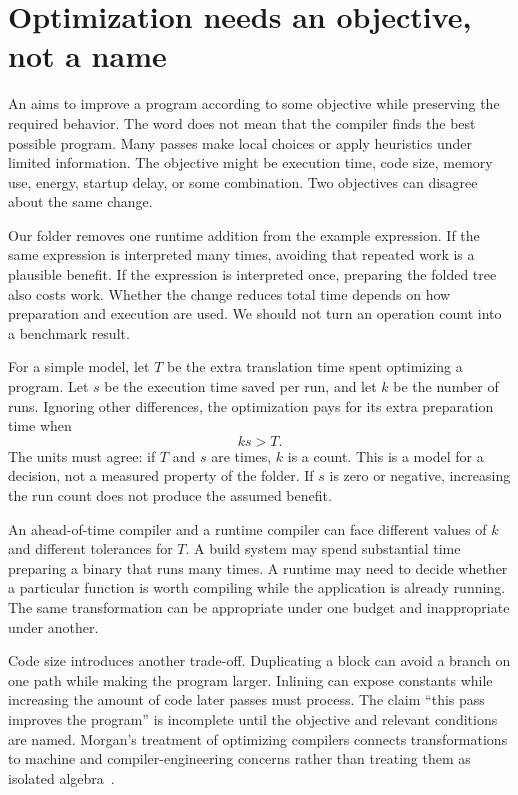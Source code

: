 \section{Optimization needs an objective, not a name}
\label{sec:optimization-objectives}

An  aims to improve a program according to some objective while preserving the required behavior.
The word does not mean that the compiler finds the best possible program.
Many passes make local choices or apply heuristics under limited information.
The objective might be execution time, code size, memory use, energy, startup delay, or some combination.
Two objectives can disagree about the same change.

Our folder removes one runtime addition from the example expression.
If the same expression is interpreted many times, avoiding that repeated work is a plausible benefit.
If the expression is interpreted once, preparing the folded tree also costs work.
Whether the change reduces total time depends on how preparation and execution are used.
We should not turn an operation count into a benchmark result.

For a simple model, let $T$ be the extra translation time spent optimizing a program.
Let $s$ be the execution time saved per run, and let $k$ be the number of runs.
Ignoring other differences, the optimization pays for its extra preparation time when
\begin{equation}
  k s > T.
  \label{eq:optimization-break-even}
\end{equation}
The units must agree: if $T$ and $s$ are times, $k$ is a count.
This is a model for a decision, not a measured property of the folder.
If $s$ is zero or negative, increasing the run count does not produce the assumed benefit.

An ahead-of-time compiler and a runtime compiler can face different values of $k$ and different tolerances for $T$.
A build system may spend substantial time preparing a binary that runs many times.
A runtime may need to decide whether a particular function is worth compiling while the application is already running.
The same transformation can be appropriate under one budget and inappropriate under another.

Code size introduces another trade-off.
Duplicating a block can avoid a branch on one path while making the program larger.
Inlining can expose constants while increasing the amount of code later passes must process.
The claim \enquote{this pass improves the program} is incomplete until the objective and relevant conditions are named.
Morgan's treatment of optimizing compilers connects transformations to machine and compiler-engineering concerns rather than treating them as isolated algebra~\cite[Chapters~1--2]{morgan-1998-optimizing}.

